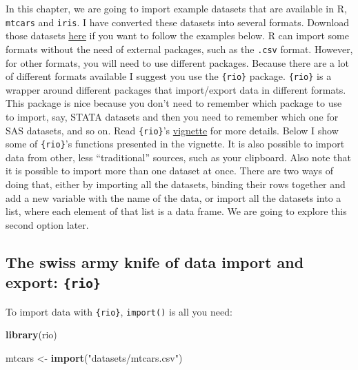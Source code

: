 \documentclass[
]{article}
\newenvironment{Shaded}{\begin{snugshade}}{\end{snugshade}}
\newcommand{\KeywordTok}[1]{\textcolor[rgb]{0.13,0.29,0.53}{\textbf{#1}}}
\newcommand{\NormalTok}[1]{#1}
\newcommand{\StringTok}[1]{\textcolor[rgb]{0.31,0.60,0.02}{#1}}
\begin{document}
In this chapter, we are going to import example datasets that are available in R, \texttt{mtcars} and
\texttt{iris}. I have converted these datasets into several formats. Download those datasets
\href{https://github.com/b-rodrigues/modern_R/tree/master/datasets}{here} if you want to follow the
examples below. R can import some formats without the need of external packages, such as the \texttt{.csv}
format. However, for other formats, you will need to use different packages. Because there are a
lot of different formats available I suggest you use the \texttt{\{rio\}} package.
\texttt{\{rio\}} is a wrapper around different packages that import/export data in different formats.
This package is nice because you don't need to remember which package to use to import, say,
STATA datasets and then you need to remember which one for SAS datasets, and so on. Read \texttt{\{rio\}}'s
\href{https://cran.r-project.org/web/packages/rio/vignettes/rio.html}{vignette} for more details. Below
I show some of \texttt{\{rio\}}'s functions presented in the vignette. It is also possible to import data from
other, less ``traditional'' sources, such as your clipboard. Also note that it is possible to import
more than one dataset at once. There are two ways of doing that, either by importing all the
datasets, binding their rows together and add a new variable with the name of the data, or import
all the datasets into a list, where each element of that list is a data frame. We are going to
explore this second option later.

\hypertarget{the-swiss-army-knife-of-data-import-and-export-rio}{%
\subsection{\texorpdfstring{The swiss army knife of data import and export: \texttt{\{rio\}}}{The swiss army knife of data import and export: \{rio\}}}\label{the-swiss-army-knife-of-data-import-and-export-rio}}

To import data with \texttt{\{rio\}}, \texttt{import()} is all you need:

\begin{Shaded}
\begin{Highlighting}[]
\KeywordTok{library}\NormalTok{(rio)}

\NormalTok{mtcars \textless{}{-}}\StringTok{ }\KeywordTok{import}\NormalTok{(}\StringTok{"datasets/mtcars.csv"}\NormalTok{)}
\end{Highlighting}
\end{Shaded}
\end{document}
